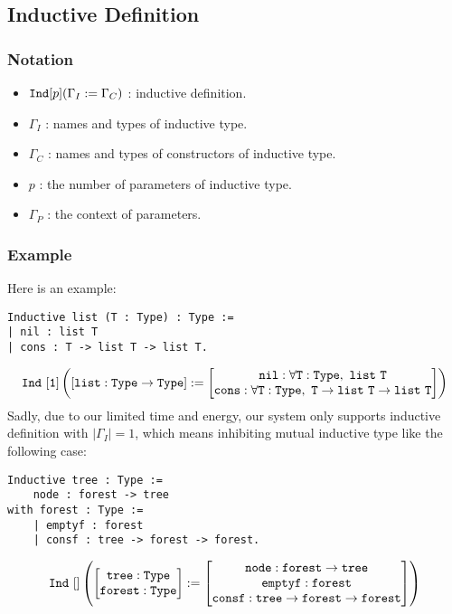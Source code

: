 \subsection{Inductive Definition}

\subsubsection{Notation}
\begin{itemize}
    \item ${\tt Ind}[p](\Gamma_I:=\Gamma_C)$ : inductive definition.
    \item $\Gamma_I$ : names and types of inductive type.
    \item $\Gamma_C$ : names and types of constructors of inductive type.
    \item $p$ : the number of parameters of inductive type.
    \item $\Gamma_P$ : the context of parameters.
\end{itemize}

\subsubsection*{Example}
Here is an example:
\begin{center}
\begin{minipage}{0.6\textwidth}
\begin{verbatim}
Inductive list (T : Type) : Type :=
| nil : list T
| cons : T -> list T -> list T.
\end{verbatim}
\end{minipage}
\end{center}
$$
\tt Ind\ [1]\left([list:Type\to Type]:=
\begin{bmatrix}
\tt nil:\forall T:Type,\ list\ T\\
\tt cons:\forall T:Type,\ T\to list\ T\to list\ T
\end{bmatrix}\right)
$$
Sadly, due to our limited time and energy, our system only supports inductive definition with $|\Gamma_I|=1$,
which means inhibiting mutual inductive type like the following case:
\begin{center}
\begin{minipage}{0.6\textwidth}
\begin{verbatim}
Inductive tree : Type :=
    node : forest -> tree
with forest : Type :=
    | emptyf : forest
    | consf : tree -> forest -> forest.
\end{verbatim}
\end{minipage}
\end{center}
$$
\tt Ind\ []\left(
\begin{bmatrix}\tt tree:Type\\\tt forest:Type\end{bmatrix}
:=
\begin{bmatrix}
\tt node:forest\to tree\\
\tt emptyf:forest\\
\tt consf:tree\to forest\to forest
\end{bmatrix}\right)
$$

